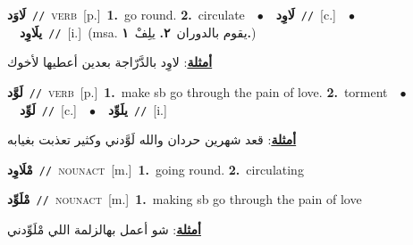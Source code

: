 \documentclass[10pt,a4paper,twoside]{article} %
\begin{document}
\begin{multicols}{2}
{\setlength\topsep{0pt}\textbf{\foreignlanguage{arabic}{لَاوَد}}\ {\color{gray}\texttt{//}\color{black}}\ \textsc{verb}\ [p.]\ \textbf{1.}~go round.  \textbf{2.}~circulate\ \ $\bullet$\ \ \setlength\topsep{0pt}\textbf{\foreignlanguage{arabic}{لَاوِد}}\ {\color{gray}\texttt{//}\color{black}}\ [c.]\ \ $\bullet$\ \ \setlength\topsep{0pt}\textbf{\foreignlanguage{arabic}{يلَاوِد}}\ {\color{gray}\texttt{//}\color{black}}\ [i.]\ \color{gray}(msa. \foreignlanguage{arabic}{يقوم بالدوران}~\foreignlanguage{arabic}{\textbf{٢.}}  \foreignlanguage{arabic}{يلِفْ}~\foreignlanguage{arabic}{\textbf{١.}})\color{black}\  \begin{flushright}\color{gray}\foreignlanguage{arabic}{\textbf{\underline{\foreignlanguage{arabic}{أمثلة}}}: لاوِد بالدَّرّاجة بعدين أعطيها لأخوك}\end{flushright}\color{black}} \vspace{2mm}

{\setlength\topsep{0pt}\textbf{\foreignlanguage{arabic}{لَوَّد}}\ {\color{gray}\texttt{//}\color{black}}\ \textsc{verb}\ [p.]\ \textbf{1.}~make sb go through the pain of love.  \textbf{2.}~torment\ \ $\bullet$\ \ \setlength\topsep{0pt}\textbf{\foreignlanguage{arabic}{لَوِّد}}\ {\color{gray}\texttt{//}\color{black}}\ [c.]\ \ $\bullet$\ \ \setlength\topsep{0pt}\textbf{\foreignlanguage{arabic}{يلَوِّد}}\ {\color{gray}\texttt{//}\color{black}}\ [i.]\  \begin{flushright}\color{gray}\foreignlanguage{arabic}{\textbf{\underline{\foreignlanguage{arabic}{أمثلة}}}: قعد شهرين حردان والله لَوَّدني وكثير تعذبت بغيابه}\end{flushright}\color{black}} \vspace{2mm}

{\setlength\topsep{0pt}\textbf{\foreignlanguage{arabic}{مْلَاوِد}}\ {\color{gray}\texttt{//}\color{black}}\ \textsc{noun\textunderscore act}\ [m.]\ \textbf{1.}~going round.  \textbf{2.}~circulating\ } \vspace{2mm}

{\setlength\topsep{0pt}\textbf{\foreignlanguage{arabic}{مْلَوِّد}}\ {\color{gray}\texttt{//}\color{black}}\ \textsc{noun\textunderscore act}\ [m.]\ \textbf{1.}~making sb go through the pain of love\  \begin{flushright}\color{gray}\foreignlanguage{arabic}{\textbf{\underline{\foreignlanguage{arabic}{أمثلة}}}: شو أعمل بهالزلمة اللي مْلَوِّدني}\end{flushright}\color{black}} \vspace{2mm}


\end{multicols}
\end{document}
